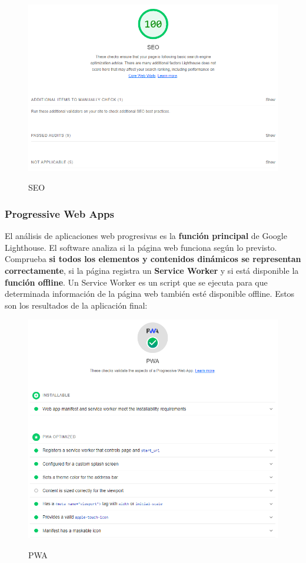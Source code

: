 \documentclass[12pt,twoside,titlepage]{report}
\begin{document}
{\begin{figure}[H]
    \centering
    \includegraphics[scale=0.6]{Lighthouse/SEO}
    \label{fig:Lighthouse_seo}
    \caption{SEO}
\end{figure}

\subsubsection{Progressive Web Apps}

El análisis de aplicaciones web progresivas es la \textbf{función principal} de Google Lighthouse. El software analiza si la página web funciona según lo previsto. Comprueba \textbf{si todos los elementos y contenidos dinámicos se representan correctamente}, si la página registra un \textbf{Service Worker} y si está disponible la \textbf{función offline}. Un Service Worker es un script que se ejecuta para que determinada información de la página web también esté disponible offline. Estos son los resultados de la aplicación final:

\begin{figure}[H]
    \centering
    \includegraphics[scale=0.6]{Lighthouse/PWA}
    \label{fig:Lighthouse_PWA}
    \caption{PWA}
\end{figure}

}
\end{document}
